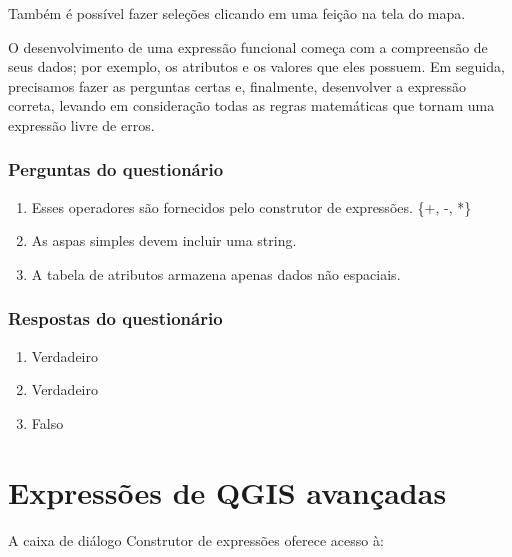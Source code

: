 \documentclass[
  portuguese,
]{krantz}
\providecommand{\tightlist}{%
  \setlength{\itemsep}{0pt}\setlength{\parskip}{0pt}}
\begin{document}
Também é possível fazer seleções clicando em uma feição na tela do mapa.

O desenvolvimento de uma expressão funcional começa com a compreensão de seus dados; por exemplo, os atributos e os valores que eles possuem. Em seguida, precisamos fazer as perguntas certas e, finalmente, desenvolver a expressão correta, levando em consideração todas as regras matemáticas que tornam uma expressão livre de erros.

\hypertarget{perguntas-do-questionuxe1rio-12}{%
\subsubsection{\texorpdfstring{\textbf{Perguntas do questionário}}{Perguntas do questionário}}\label{perguntas-do-questionuxe1rio-12}}

\begin{enumerate}
\def\labelenumi{\arabic{enumi}.}
\tightlist
\item
  Esses operadores são fornecidos pelo construtor de expressões. \{+, -, *\}
\item
  As aspas simples devem incluir uma string.
\item
  A tabela de atributos armazena apenas dados não espaciais.
\end{enumerate}

\hypertarget{respostas-do-questionuxe1rio-4}{%
\subsubsection{\texorpdfstring{\textbf{Respostas do questionário}}{Respostas do questionário}}\label{respostas-do-questionuxe1rio-4}}

\begin{enumerate}
\def\labelenumi{\arabic{enumi}.}
\tightlist
\item
  Verdadeiro
\item
  Verdadeiro
\item
  Falso
\end{enumerate}

\hypertarget{expressuxf5es-de-qgis-avanuxe7adas}{%
\section{Expressões de QGIS avançadas}\label{expressuxf5es-de-qgis-avanuxe7adas}}

A caixa de diálogo Construtor de expressões oferece acesso à:
\end{document}
